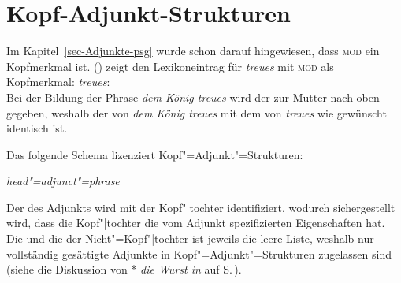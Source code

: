 \section{Kopf-Adjunkt-Strukturen}
\label{sec-Kopf-Adjunkt-Strukturen}

Im Kapitel~\ref{sec-Adjunkte-psg} wurde schon darauf hingewiesen, dass \textsc{mod} ein Kopfmerkmal
ist. () zeigt den Lexikoneintrag für \emph{treues} mit \textsc{mod} als Kopfmerkmal:
\ea
\label{le-treue-head-mod}
\emph{treues}:\\
\z
Bei der Bildung der Phrase \emph{dem König treues} wird der \headw zur Mutter nach oben gegeben,
weshalb der \modw von \emph{dem König treues} mit dem von \emph{treues} wie gewünscht identisch ist.

Das folgende Schema lizenziert Kopf"=Adjunkt"=Strukturen:
\begin{samepage}
\begin{schema}
\label{ha-schema-prel}
\textit{head"=adjunct"=phrase} \impl\\
\end{schema}
\end{samepage}
Der \modw des Adjunkts  wird mit der Kopf"|tochter identifiziert, wodurch
sichergestellt wird, dass die Kopf"|tochter die vom Adjunkt spezifizierten Eigenschaften hat. Die
\sprl und die \compsl der Nicht"=Kopf"|tochter ist jeweils die leere Liste, weshalb nur vollständig gesättigte Adjunkte 
in Kopf"=Adjunkt"=Strukturen zugelassen sind (siehe die Diskussion von * \emph{die Wurst in} auf S.\,\pageref{ex-die-Wurst-in}).

